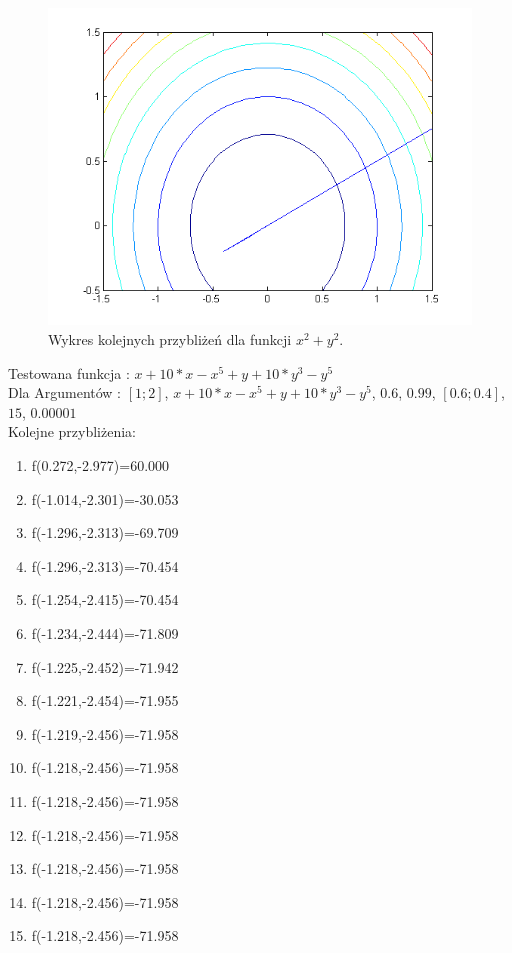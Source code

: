 \documentclass{classrep}
\begin{document}
\begin{figure}[H]
\centering
\includegraphics[width=12cm]{fcja1} 
\caption{Wykres kolejnych przybliżeń dla funkcji $x^2+y^2$.}
\label{fig:funkcja_1}
\end{figure}

Testowana funkcja : $x + 10*x - x^5 + y + 10*y^3 - y^5$\\
Dla Argumentów : $[1;2]$, $x + 10*x - x^5 + y + 10*y^3 - y^5$, $0.6$, $0.99$, $[0.6;0.4]$, $15$, $0.00001$\\
Kolejne przybliżenia:
\begin{enumerate}
\item f(0.272,-2.977)=60.000
\item f(-1.014,-2.301)=-30.053
\item f(-1.296,-2.313)=-69.709
\item f(-1.296,-2.313)=-70.454
\item f(-1.254,-2.415)=-70.454
\item f(-1.234,-2.444)=-71.809
\item f(-1.225,-2.452)=-71.942
\item f(-1.221,-2.454)=-71.955
\item f(-1.219,-2.456)=-71.958
\item f(-1.218,-2.456)=-71.958
\item f(-1.218,-2.456)=-71.958
\item f(-1.218,-2.456)=-71.958
\item f(-1.218,-2.456)=-71.958
\item f(-1.218,-2.456)=-71.958
\item f(-1.218,-2.456)=-71.958
\end{enumerate}
\end{document}
